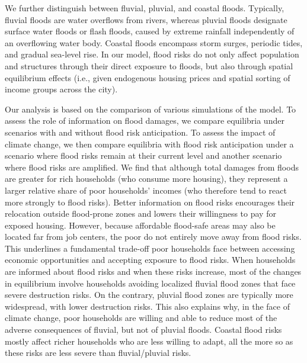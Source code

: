\documentclass[12pt]{article}
\begin{document}

We further distinguish between fluvial, pluvial, and coastal floods. Typically, fluvial floods are water overflows from rivers, whereas pluvial floods designate surface water floods or flash floods, caused by extreme rainfall independently of an overflowing water body. Coastal floods encompass storm surges, periodic tides, and gradual sea-level rise. In our model, flood risks do not only affect population and structures through their direct exposure to floods, but also through spatial equilibrium effects (i.e., given endogenous housing prices and spatial sorting of income groups across the city).

Our analysis is based on the comparison of various simulations of the model. To assess the role of information on flood damages, we compare equilibria under scenarios with and without flood risk anticipation. To assess the impact of climate change, we then compare equilibria with flood risk anticipation under a scenario where flood risks remain at their current level and another scenario where flood risks are amplified. We find that although total damages from floods are greater for rich households (who consume more housing), they represent a larger relative share of poor households’ incomes (who therefore tend to react more strongly to flood risks). Better information on flood risks encourages their relocation outside flood-prone zones and lowers their willingness to pay for exposed housing. However, because affordable flood-safe areas may also be located far from job centers, the poor do not entirely move away from flood risks. This underlines a fundamental trade-off poor households face between accessing economic opportunities and accepting exposure to flood risks. When households are informed about flood risks and when these risks increase, most of the changes in equilibrium involve households avoiding localized fluvial flood zones that face severe destruction risks. On the contrary, pluvial flood zones are typically more widespread, with lower destruction risks. This also explains why, in the face of climate change, poor households are willing and able to reduce most of the adverse consequences of fluvial, but not of pluvial floods. Coastal flood risks mostly affect richer households who are less willing to adapt, all the more so as these risks are less severe than fluvial/pluvial risks.

\end{document}
